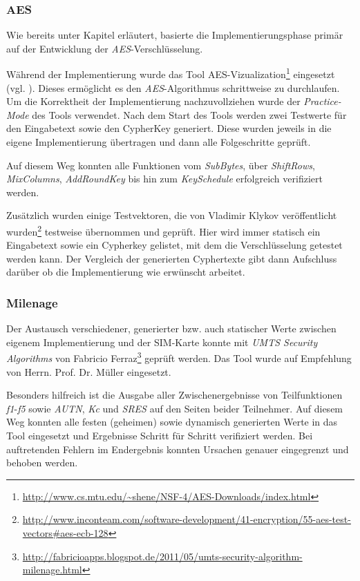 		\subsubsection{AES}
		Wie bereits unter Kapitel  erläutert, basierte die Implementierungsphase
		primär auf der Entwicklung der \textit{AES}-Verschlüsselung. 

		Während der Implementierung wurde das Tool AES-Vizualization\footnote{\url{http://www.cs.mtu.edu/~shene/NSF-4/AES-Downloads/index.html}} eingesetzt (vgl. ).
		Dieses ermöglicht es den \textit{AES}-Algorithmus schrittweise zu durchlaufen.
		Um die Korrektheit der Implementierung nachzuvollziehen wurde der \textit{Practice-Mode}
		des Tools verwendet. Nach dem Start des Tools werden zwei Testwerte für den
		Eingabetext sowie den CypherKey generiert. Diese wurden jeweils in die eigene
		Implementierung übertragen und dann alle Folgeschritte geprüft.

		Auf diesem Weg konnten alle Funktionen vom \textit{SubBytes}, über \textit{ShiftRows},
		\textit{MixColumns}, \textit{AddRoundKey} bis hin zum \textit{KeySchedule} erfolgreich verifiziert
		werden.

		Zusätzlich wurden einige Testvektoren, die von Vladimir Klykov veröffentlicht
		wurden\footnote{\url{http://www.inconteam.com/software-development/41-encryption/55-aes-test-vectors\#aes-ecb-128}}
		testweise übernommen und geprüft. Hier wird immer statisch ein Eingabetext sowie ein
		Cypherkey gelistet, mit dem die Verschlüsselung getestet werden kann. Der Vergleich
		der generierten Cyphertexte gibt dann Aufschluss darüber ob die Implementierung
		wie erwünscht arbeitet.


		\subsubsection{Milenage}
		Der Austausch verschiedener, generierter bzw. auch statischer Werte zwischen eigenem
		Implementierung und der SIM-Karte konnte mit \textit{UMTS Security Algorithms}
		von Fabricio Ferraz\footnote{\url{http://fabricioapps.blogspot.de/2011/05/umts-security-algorithm-milenage.html}}
		geprüft werden. Das Tool wurde auf Empfehlung von Herrn. Prof. Dr. Müller eingesetzt.

		Besonders hilfreich ist die Ausgabe aller Zwischenergebnisse von Teilfunktionen
		\textit{f1}-\textit{f5} sowie \textit{AUTN}, \textit{Kc} und \textit{SRES} auf
		den Seiten beider Teilnehmer. Auf diesem Weg konnten alle festen (geheimen) sowie
		dynamisch generierten Werte in das Tool eingesetzt und Ergebnisse Schritt für
		Schritt verifiziert werden. Bei auftretenden Fehlern im Endergebnis konnten Ursachen
		genauer eingegrenzt und behoben werden.

